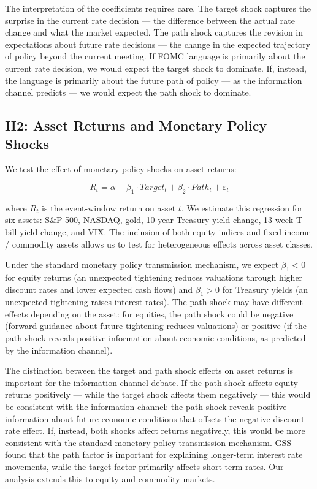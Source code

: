 The interpretation of the coefficients requires care. The target shock captures the surprise in the current rate decision --- the difference between the actual rate change and what the market expected. The path shock captures the revision in expectations about future rate decisions --- the change in the expected trajectory of policy beyond the current meeting. If FOMC language is primarily about the current rate decision, we would expect the target shock to dominate. If, instead, the language is primarily about the future path of policy --- as the information channel predicts --- we would expect the path shock to dominate.

\subsection{H2: Asset Returns and Monetary Policy Shocks}

We test the effect of monetary policy shocks on asset returns:

\begin{equation*}
R_t = \alpha + \beta_1 \cdot Target_t + \beta_2 \cdot Path_t + \varepsilon_t
\end{equation*}

where $R_t$ is the event-window return on asset $t$. We estimate this regression for six assets: S\&P 500, NASDAQ, gold, 10-year Treasury yield change, 13-week T-bill yield change, and VIX. The inclusion of both equity indices and fixed income / commodity assets allows us to test for heterogeneous effects across asset classes.

Under the standard monetary policy transmission mechanism, we expect $\beta_1 < 0$ for equity returns (an unexpected tightening reduces valuations through higher discount rates and lower expected cash flows) and $\beta_1 > 0$ for Treasury yields (an unexpected tightening raises interest rates). The path shock may have different effects depending on the asset: for equities, the path shock could be negative (forward guidance about future tightening reduces valuations) or positive (if the path shock reveals positive information about economic conditions, as predicted by the information channel).

The distinction between the target and path shock effects on asset returns is important for the information channel debate. If the path shock affects equity returns positively --- while the target shock affects them negatively --- this would be consistent with the information channel: the path shock reveals positive information about future economic conditions that offsets the negative discount rate effect. If, instead, both shocks affect returns negatively, this would be more consistent with the standard monetary policy transmission mechanism. GSS found that the path factor is important for explaining longer-term interest rate movements, while the target factor primarily affects short-term rates. Our analysis extends this to equity and commodity markets.

